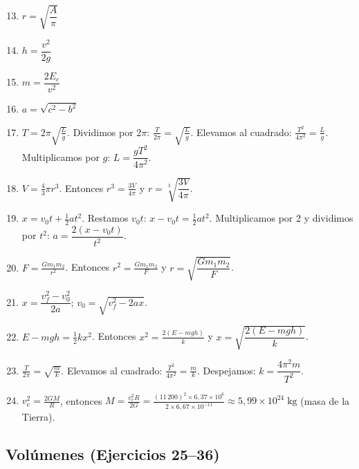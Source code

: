 \documentclass[12pt, a4paper]{article}
\begin{document}
\begin{enumerate}[leftmargin=*, label=\textbf{\arabic*.}]
  \setcounter{enumi}{12}
  \item $r = \sqrt{\dfrac{A}{\pi}}$

  \item $h = \dfrac{v^2}{2g}$

  \item $m = \dfrac{2E_c}{v^2}$

  \item $a = \sqrt{c^2 - b^2}$

  \item $T = 2\pi\sqrt{\frac{L}{g}}$. Dividimos por $2\pi$: $\frac{T}{2\pi} = \sqrt{\frac{L}{g}}$. Elevamos al cuadrado: $\frac{T^2}{4\pi^2} = \frac{L}{g}$. Multiplicamos por $g$: $L = \dfrac{gT^2}{4\pi^2}$.

  \item $V = \frac{4}{3}\pi r^3$. Entonces $r^3 = \frac{3V}{4\pi}$ y $r = \sqrt[3]{\dfrac{3V}{4\pi}}$.

  \item $x = v_0 t + \frac{1}{2}at^2$. Restamos $v_0 t$: $x - v_0 t = \frac{1}{2}at^2$. Multiplicamos por 2 y dividimos por $t^2$: $a = \dfrac{2(x - v_0 t)}{t^2}$.

  \item $F = \frac{Gm_1m_2}{r^2}$. Entonces $r^2 = \frac{Gm_1m_2}{F}$ y $r = \sqrt{\dfrac{Gm_1m_2}{F}}$.

  \item $x = \dfrac{v_f^2 - v_0^2}{2a}$; \quad $v_0 = \sqrt{v_f^2 - 2ax}$.

  \item $E - mgh = \frac{1}{2}kx^2$. Entonces $x^2 = \frac{2(E - mgh)}{k}$ y $x = \sqrt{\dfrac{2(E - mgh)}{k}}$.

  \item $\frac{T}{2\pi} = \sqrt{\frac{m}{k}}$. Elevamos al cuadrado: $\frac{T^2}{4\pi^2} = \frac{m}{k}$. Despejamos: $k = \dfrac{4\pi^2 m}{T^2}$.

  \item $v_e^2 = \frac{2GM}{R}$, entonces $M = \frac{v_e^2 R}{2G} = \frac{(11\,200)^2 \times 6{,}37 \times 10^6}{2 \times 6{,}67 \times 10^{-11}} \approx 5{,}99 \times 10^{24}\;\text{kg}$ (masa de la Tierra).
\end{enumerate}

\subsection*{Volúmenes (Ejercicios 25--36)}
\end{document}
